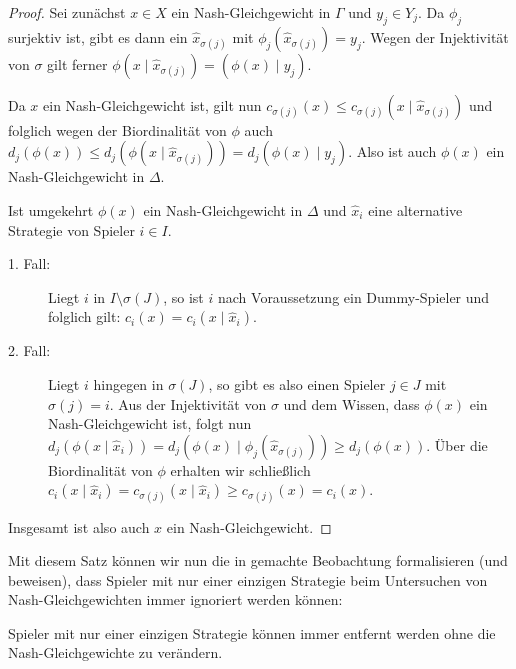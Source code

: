 \begin{proof}
	Sei zunächst $x \in X$ ein Nash-Gleichgewicht in $\Gamma$ und $y_j \in Y_j$. Da $\phi_j$ surjektiv ist, gibt es dann ein $\hat{x}_{\sigma(j)}$ mit $\phi_j(\hat{x}_{\sigma(j)}) = y_j$. Wegen der Injektivität von $\sigma$ gilt ferner $\phi(x \mid \hat{x}_{\sigma(j)}) = \left(\phi(x) \mid y_j\right)$.
	
	Da $x$ ein Nash-Gleichgewicht ist, gilt nun $c_{\sigma(j)}(x) \leq c_{\sigma(j)}(x \mid \hat{x}_{\sigma(j)})$ und folglich wegen der Biordinalität von $\phi$ auch $d_j(\phi(x)) \leq d_j(\phi(x \mid \hat{x}_{\sigma(j)})) = d_j(\phi(x) \mid y_j)$. Also ist auch $\phi(x)$ ein Nash-Gleichgewicht in $\Delta$.
	
	Ist umgekehrt $\phi(x)$ ein Nash-Gleichgewicht in $\Delta$ und $\hat{x}_i$ eine alternative Strategie von Spieler $i \in I$. 
	\begin{description}
		\item[1. Fall:] Liegt $i$ in $I\setminus \sigma(J)$, so ist $i$ nach Voraussetzung ein Dummy-Spieler und folglich gilt: $c_i(x) = c_i(x \mid \hat{x}_i)$.
		\item[2. Fall:] Liegt $i$ hingegen in $\sigma(J)$, so gibt es also einen Spieler $j \in J$ mit $\sigma(j) = i$. Aus der Injektivität von $\sigma$ und dem Wissen, dass $\phi(x)$ ein Nash-Gleichgewicht ist, folgt nun $d_j(\phi(x \mid \hat{x}_i)) = d_j(\phi(x) \mid \phi_j(\hat{x}_{\sigma(j)})) \geq d_j(\phi(x))$. Über die Biordinalität von $\phi$ erhalten wir schließlich $c_i(x \mid \hat{x}_i) = c_{\sigma(j)}(x \mid \hat{x}_i) \geq c_{\sigma(j)}(x) = c_i(x)$. 
	\end{description}
	Insgesamt ist also auch $x$ ein Nash-Gleichgewicht.
\end{proof}

Mit diesem Satz können wir nun die in  gemachte Beobachtung formalisieren (und beweisen), dass Spieler mit nur einer einzigen Strategie beim Untersuchen von Nash-Gleichgewichten immer ignoriert werden können:

\begin{kor}\label{kor:EinStratSpielerWeglassen}
	Spieler mit nur einer einzigen Strategie können immer entfernt werden ohne die Nash-Gleichgewichte zu verändern.
\end{kor}

